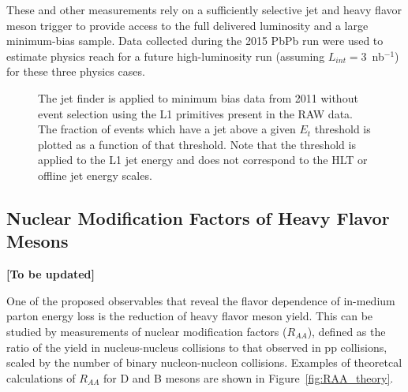 These and other measurements rely on a sufficiently selective jet and heavy flavor meson trigger to provide access to the 
full delivered luminosity and a large minimum-bias sample.  Data collected during the 2015 PbPb run were used to estimate physics reach  
for a future high-luminosity run (assuming $L_{int} =$3~nb$^{-1}$) for these three physics cases. 

\begin{figure}[!ht]
\begin{center}
\caption{The jet finder is applied to minimum bias data from 2011 without
event selection using the L1 primitives present in the RAW data. The
fraction of events which have a jet above a given $E_t$ threshold is plotted
as a function of that threshold. Note that the threshold is applied to the
L1 jet energy and does not correspond to the HLT or offline jet energy
scales.}
\label{fig:efficiency_comparison}
\end{center}
\end{figure}


\subsection{Nuclear Modification Factors of Heavy Flavor Mesons}
{\bf [To be updated]}

One of the proposed observables that reveal the flavor dependence of in-medium parton energy loss is the reduction of heavy flavor meson yield. This can be studied by measurements of nuclear modification factors ($R_{AA}$), defined as the ratio of the yield in nucleus-nucleus collisions to that observed in pp collisions, scaled by the number of binary nucleon-nucleon collisions. Examples of theoretcal calculations of $R_{AA}$ for D and B mesons are shown in Figure~\ref{fig:RAA_theory}. 

